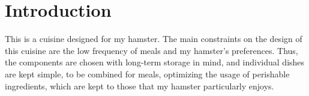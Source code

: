 \documentclass[main]{subfiles}
\begin{document}
\section*{Introduction}
\label{sec:intro}

This is a cuisine designed for my hamster. The main constraints on the design of this cuisine are the low frequency of meals and my hamster's preferences.
Thus, the components are chosen with long-term storage in mind, and individual dishes are kept simple, to be combined for meals, optimizing the usage of perishable ingredients,
which are kept to those that my hamster particularly enjoys.
\end{document}
